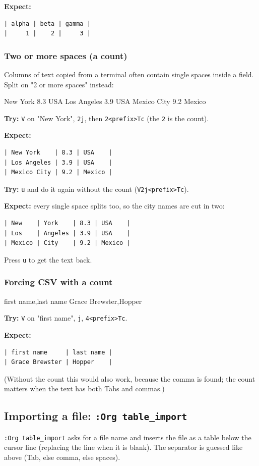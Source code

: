 \textbf{Expect:}
\begin{verbatim}
| alpha | beta | gamma |
|     1 |    2 |     3 |
\end{verbatim}
\subsubsection{Two or more spaces (a count)}
\label{sec:orgc8c3ec6}
Columns of text copied from a terminal often contain single spaces inside a
field. Split on "2 or more spaces" instead:

New York     8.3   USA
Los Angeles  3.9   USA
Mexico City  9.2   Mexico

\textbf{Try:} \texttt{V} on "New York", \texttt{2j}, then \texttt{2<prefix>Tc} (the \texttt{2} is the count).

\textbf{Expect:}
\begin{verbatim}
| New York    | 8.3 | USA    |
| Los Angeles | 3.9 | USA    |
| Mexico City | 9.2 | Mexico |
\end{verbatim}

\textbf{Try:} \texttt{u} and do it again without the count (\texttt{V2j<prefix>Tc}).

\textbf{Expect:} every single space splits too, so the city names are cut in two:
\begin{verbatim}
| New    | York    | 8.3 | USA    |
| Los    | Angeles | 3.9 | USA    |
| Mexico | City    | 9.2 | Mexico |
\end{verbatim}

Press \texttt{u} to get the text back.
\subsubsection{Forcing CSV with a count}
\label{sec:orgd54f3f3}
first name,last name
Grace Brewster,Hopper

\textbf{Try:} \texttt{V} on "first name", \texttt{j}, \texttt{4<prefix>Tc}.

\textbf{Expect:}
\begin{verbatim}
| first name     | last name |
| Grace Brewster | Hopper    |
\end{verbatim}

(Without the count this would also work, because the comma is found; the
count matters when the text has both Tabs and commas.)
\subsection{Importing a file: \texttt{:Org table\_import}}
\label{sec:orgbdd1cd6}
\texttt{:Org table\_import} asks for a file name and inserts the file as a table
below the cursor line (replacing the line when it is blank). The separator
is guessed like above (Tab, else comma, else spaces).

